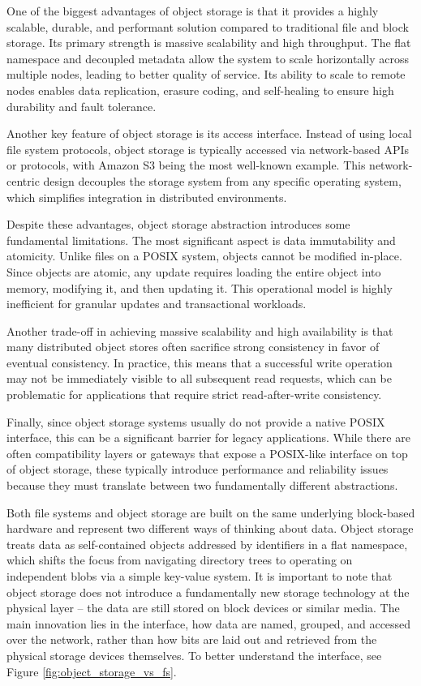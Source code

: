 One of the biggest advantages of object storage is that it provides a highly scalable, durable, and performant solution compared to traditional file and block storage. Its primary strength is massive scalability and high throughput. The flat namespace and decoupled metadata allow the system to scale horizontally across multiple nodes, leading to better quality of service. Its ability to scale to remote nodes enables data replication, erasure coding, and self-healing to ensure high durability and fault tolerance. \cite{systemdesignschool_maximizing_2025}

Another key feature of object storage is its access interface. Instead of using local file system protocols, object storage is typically accessed via network-based APIs or protocols, with Amazon S3 being the most well-known example. This network-centric design decouples the storage system from any specific operating system, which simplifies integration in distributed environments.

Despite these advantages, object storage abstraction introduces some fundamental limitations. The most significant aspect is data immutability and atomicity. Unlike files on a POSIX system, objects cannot be modified in-place. Since objects are atomic, any update requires loading the entire object into memory, modifying it, and then updating it. This operational model is highly inefficient for granular updates and transactional workloads.

Another trade-off in achieving massive scalability and high availability is that many distributed object stores often sacrifice strong consistency in favor of eventual consistency. In practice, this means that a successful write operation may not be immediately visible to all subsequent read requests, which can be problematic for applications that require strict read-after-write consistency.

Finally, since object storage systems usually do not provide a native POSIX interface, this can be a significant barrier for legacy applications. While there are often compatibility layers or gateways that expose a POSIX-like interface on top of object storage, these typically introduce performance and reliability issues because they must translate between two fundamentally different abstractions. \cite{mesnier_storage_2003, systemdesignschool_maximizing_2025}

\vspace{1.5em}
Both file systems and object storage are built on the same underlying block-based hardware and represent two different ways of thinking about data. Object storage treats data as self-contained objects addressed by identifiers in a flat namespace, which shifts the focus from navigating directory trees to operating on independent blobs via a simple key-value system. It is important to note that object storage does not introduce a fundamentally new storage technology at the physical layer -- the data are still stored on block devices or similar media. The main innovation lies in the interface, how data are named, grouped, and accessed over the network, rather than how bits are laid out and retrieved from the physical storage devices themselves. To better understand the interface, see Figure \ref{fig:object_storage_vs_fs}.

